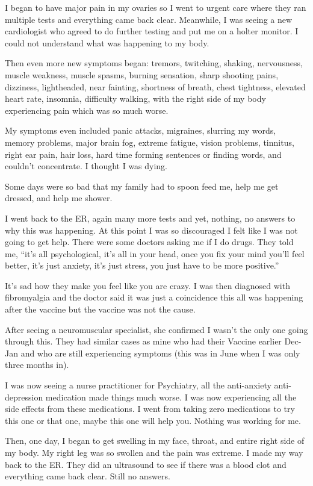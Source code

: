 I began to have major pain in my ovaries so I went to urgent care where they ran
multiple tests and everything came back clear. Meanwhile, I was seeing a new
cardiologist who agreed to do further testing and put me on a holter monitor. I
could not understand what was happening to my body.

Then even more new symptoms began: tremors, twitching, shaking, nervousness,
muscle weakness, muscle spasms, burning sensation, sharp shooting pains,
dizziness, lightheaded, near fainting, shortness of breath, chest tightness,
elevated heart rate, insomnia, difficulty walking, with the right side of my
body experiencing pain which was so much worse.

My symptoms even included panic attacks, migraines, slurring my words, memory
problems, major brain fog, extreme fatigue, vision problems, tinnitus, right ear
pain, hair loss, hard time forming sentences or finding words, and couldn’t
concentrate. I thought I was dying.

Some days were so bad that my family had to spoon feed me, help me get dressed,
and help me shower.

I went back to the ER, again many more tests and yet, nothing, no answers to why
this was happening. At this point I was so discouraged I felt like I was not
going to get help. There were some doctors asking me if I do drugs. They told
me, “it’s all psychological, it’s all in your head, once you fix your mind
you’ll feel better, it’s just anxiety, it’s just stress, you just have to be
more positive.”

It’s sad how they make you feel like you are crazy. I was then diagnosed with
fibromyalgia and the doctor said it was just a coincidence this all was
happening after the vaccine but the vaccine was not the cause.

After seeing a neuromuscular specialist, she confirmed I wasn’t the only one
going through this. They had similar cases as mine who had their Vaccine earlier
Dec-Jan and who are still experiencing symptoms (this was in June when I was
only three months in).

I was now seeing a nurse practitioner for Psychiatry, all the anti-anxiety
anti-depression medication made things much worse. I was now experiencing all
the side effects from these medications. I went from taking zero medications to
try this one or that one, maybe this one will help you. Nothing was working for
me.

Then, one day, I began to get swelling in my face, throat, and entire right side
of my body. My right leg was so swollen and the pain was extreme. I made my way
back to the ER. They did an ultrasound to see if there was a blood clot and
everything came back clear. Still no answers.

